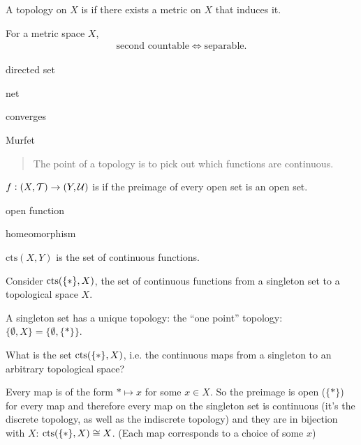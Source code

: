\begin{definition*}
  A topology on $X$ is  if there exists a metric on $X$ that induces it.
\end{definition*}


\begin{theorem}
  For a metric space $X$,
  \begin{align*}
    \text{second countable} \iff \text{separable}.
  \end{align*}
\end{theorem}

\begin{definition}
  directed set

  net

  converges
\end{definition}


\begin{theorem}
\end{theorem}

Murfet
\begin{quote}
  The point of a topology is to pick out which functions are continuous.
\end{quote}

\begin{definition}
  $f: (X, \mathcal T) \to (Y, \mathcal U)$ is  if the preimage of every open set is an open set.

  open function

  homeomorphism
\end{definition}

\begin{example}[cts]
  $\text{cts}(X, Y)$ is the set of continuous functions.

  Consider $\text{cts}(\{*\}, X)$, the set of continuous functions from a singleton set to a topological space $X$.

  A singleton set has a unique topology: the ``one point​'' topology: $\{\emptyset, X\} = \{\emptyset, \{*\}\}$.

  What is the set $\text{cts}(\{*\}, X)$, i.e. the continuous maps from a singleton to an arbitrary topological
  space?

  Every map is of the form $* \mapsto x$ for some $x \in X$. So the preimage is open ($\{*\}$) for every map
  and therefore every map on the singleton set is continuous (it's the discrete topology, as well as the
  indiscrete topology) and they are in bijection with $X$: $\text{cts}(\{*\}, X) \cong X$. (Each map corresponds to a
  choice of some $x$)
\end{example}

